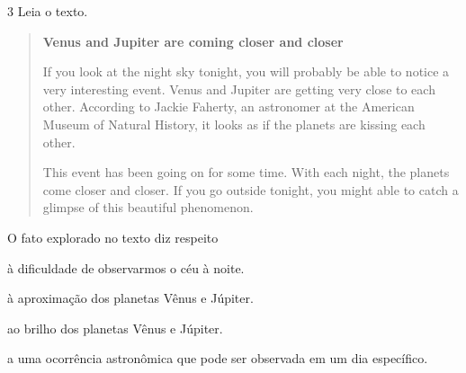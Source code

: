 \num{3} Leia o texto.

\begin{quote}
\textbf{Venus and Jupiter are coming closer and closer}

If you look at the night sky tonight, you will probably be able to notice a very interesting event. Venus and Jupiter are getting very close to each other. According to Jackie Faherty, an astronomer at the American Museum of Natural History, it looks as if the planets are kissing each other.

This event has been going on for some time. With each night, the planets come closer and closer. If you go outside tonight, you might able to catch a glimpse of this beautiful phenomenon. 

\end{quote}

O fato explorado no texto diz respeito

\begin{escolha}
\item à dificuldade de observarmos o céu à noite.

\item à aproximação dos planetas Vênus e Júpiter.

\item ao brilho dos planetas Vênus e Júpiter.

\item a uma ocorrência astronômica que pode ser observada em um dia específico.
\end{escolha}





